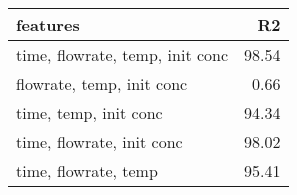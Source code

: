 \begin{longtable}{lr}
\hline
 features                        &    R2 \\
\hline
 time, flowrate, temp, init conc & 98.54 \\
 flowrate, temp, init conc       &  0.66 \\
 time, temp, init conc           & 94.34 \\
 time, flowrate, init conc       & 98.02 \\
 time, flowrate, temp            & 95.41 \\
\hline
\end{longtable}
